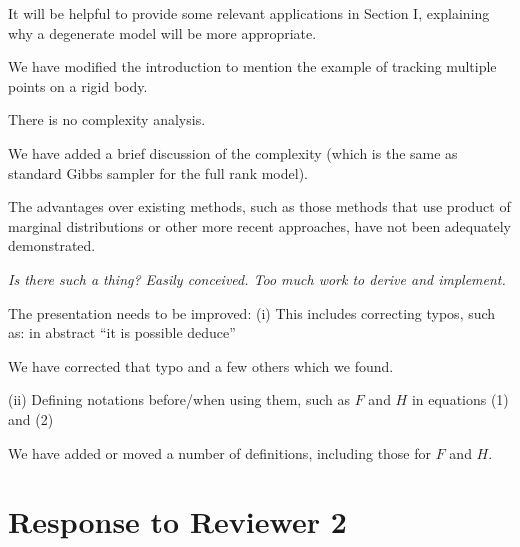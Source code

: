 \documentclass{article}
\newenvironment{review}[0]{\begin{itshape}\color{Gray}\noindent}{\end{itshape}\vspace{0.4cm}}
\newenvironment{response}[0]{\noindent}{\vspace{0.4cm}}
\newcommand{\meta}[1]{{\color{red}\em #1}}
\begin{document}
\begin{review}
It will be helpful to provide some relevant applications in Section I, explaining why a degenerate model will be more appropriate.
\end{review}

\begin{response}
We have modified the introduction to mention the example of tracking multiple points on a rigid body.
\end{response}

\begin{review}
There is no complexity analysis.
\end{review}

\begin{response}
We have added a brief discussion of the complexity (which is the same as standard Gibbs sampler for the full rank model).
\end{response}

\begin{review}
The advantages over existing methods, such as those methods that use product of marginal distributions or other more recent approaches, have not been adequately demonstrated.
\end{review}

\begin{response}
 \meta{Is there such a thing? Easily conceived. Too much work to derive and implement.}
\end{response}

\begin{review}
The presentation needs to be improved:
(i) This includes correcting typos, such as: in abstract ``it is possible deduce''
\end{review}

\begin{response}
 We have corrected that typo and a few others which we found.
\end{response}

\begin{review}
(ii) Defining notations before/when using them, such as $F$ and $H$ in equations (1) and (2)
\end{review}

\begin{response}
 We have added or moved a number of definitions, including those for $F$ and $H$.
\end{response}



\section*{Response to Reviewer 2}
\end{document}
